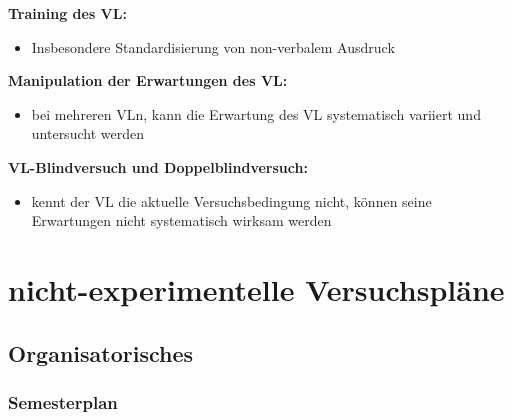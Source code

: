 \documentclass[
]{book}
\providecommand{\tightlist}{%
  \setlength{\itemsep}{0pt}\setlength{\parskip}{0pt}}
\begin{document}
\textbf{Training des VL:}

\begin{itemize}
\tightlist
\item
  Insbesondere Standardisierung von non-verbalem Ausdruck
\end{itemize}

\textbf{Manipulation der Erwartungen des VL:}

\begin{itemize}
\tightlist
\item
  bei mehreren VLn, kann die Erwartung des VL systematisch variiert und untersucht werden
\end{itemize}

\textbf{VL-Blindversuch und Doppelblindversuch:}

\begin{itemize}
\tightlist
\item
  kennt der VL die aktuelle Versuchsbedingung nicht, können seine Erwartungen nicht systematisch wirksam werden
\end{itemize}

\hypertarget{nicht-experimentelle-versuchspluxe4ne}{%
\chapter{nicht-experimentelle Versuchspläne}\label{nicht-experimentelle-versuchspluxe4ne}}

\hypertarget{organisatorisches-7}{%
\section{Organisatorisches}\label{organisatorisches-7}}

\hypertarget{semesterplan-8}{%
\subsection{Semesterplan}\label{semesterplan-8}}
\end{document}
